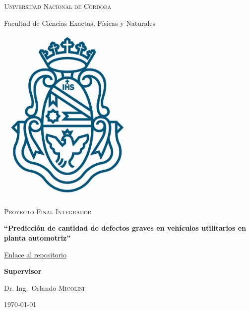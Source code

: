 \documentclass[a4paper,12pt]{article}
\author{Gerardo A. COLLANTE \\ Matrícula: 39.022.782 \\ Email: \href{mailto:gerardo.collante@unc.edu.ar}{gerardo.collante@unc.edu.ar} \\ Cel: 54 (03574) 650490}
\begin{document}
\makeatletter
\begin{titlepage}
				
	{\scshape\LARGE Universidad Nacional de Córdoba \par}
	{\Large Facultad de Ciencias Exactas, Físicas y Naturales \par}
	\vspace{0.5cm}
	\centering
	\includegraphics[width=0.5\textwidth]{unc.png}
	\par\vspace{0.5cm}
	\vspace{0.5cm}
	{\scshape\Large Proyecto Final Integrador\par}
	\vspace{1cm}
	{\large\bfseries ``Predicción de cantidad de defectos graves en vehículos utilitarios en planta automotriz'' \par}
	
	\vspace{0.25cm}
		
	\href{https://github.com/GeraCollante/tesis-icomp-machinelearning}{\color{blue}Enlace al repositorio}
		
	\vspace{0.7cm}
				
	\normalsize\@author\space
				
	\vspace{0.7cm}
	\textbf{Supervisor}\par
	Dr. Ing.~Orlando \textsc{Micolini}
			
	\vfill
			
	{\large \today\par}
\end{titlepage}
\end{document}
